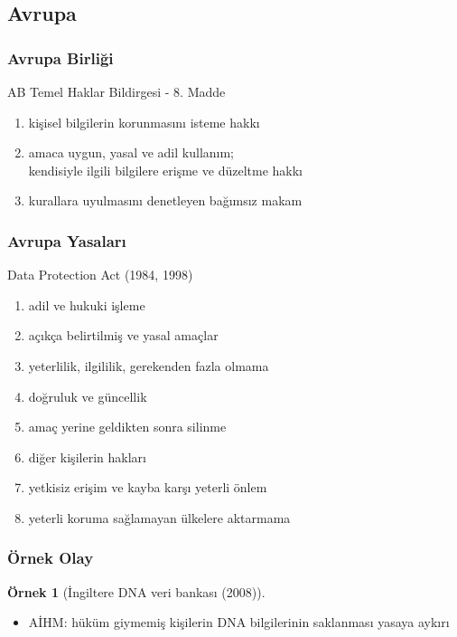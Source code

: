\documentclass[dvipsnames]{beamer}
\theoremstyle{definition}
\theoremstyle{example}
\newtheorem{ornek}[theorem]{Örnek}
\theoremstyle{plain}
\begin{document}
\subsection{Avrupa}

\begin{frame}
  \frametitle{Avrupa Birliği}

  \begin{block}{AB Temel Haklar Bildirgesi - 8. Madde}
    \begin{enumerate}
      \item kişisel bilgilerin korunmasını isteme hakkı

      \pause
      \item amaca uygun, yasal ve adil kullanım;\\
        kendisiyle ilgili bilgilere erişme ve düzeltme hakkı

      \pause
      \item kurallara uyulmasını denetleyen bağımsız makam
    \end{enumerate}
  \end{block}
\end{frame}

\begin{frame}
  \frametitle{Avrupa Yasaları}

  \begin{block}{Data Protection Act (1984, 1998)}

    \begin{enumerate}
      \item adil ve hukuki işleme
      \item açıkça belirtilmiş ve yasal amaçlar
      \item yeterlilik, ilgililik, gerekenden fazla olmama
      \item doğruluk ve güncellik
      \item amaç yerine geldikten sonra silinme
      \item diğer kişilerin hakları
      \item yetkisiz erişim ve kayba karşı yeterli önlem
      \item yeterli koruma sağlamayan ülkelere aktarmama
    \end{enumerate}
  \end{block}
\end{frame}

\begin{frame}
  \frametitle{Örnek Olay}

  \begin{ornek}[İngiltere DNA veri bankası (2008)]
    \begin{itemize}
      \item AİHM: hüküm giymemiş kişilerin DNA bilgilerinin saklanması
        yasaya aykırı
    \end{itemize}
  \end{ornek}
\end{frame}
\end{document}
